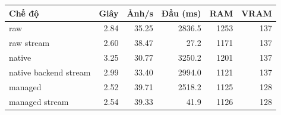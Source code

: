 \begin{tabular}{lrrrrr}
\toprule
Chế độ & Giây & Ảnh/s & Đầu (ms) & RAM & VRAM \\
\midrule
raw & 2.84 & 35.25 & 2836.5 & 1253 & 137 \\
raw stream & 2.60 & 38.47 & 27.2 & 1171 & 137 \\
native & 3.25 & 30.77 & 3250.2 & 1201 & 137 \\
native backend stream & 2.99 & 33.40 & 2994.0 & 1121 & 137 \\
managed & 2.52 & 39.71 & 2518.2 & 1125 & 128 \\
managed stream & 2.54 & 39.33 & 41.9 & 1126 & 128 \\
\bottomrule
\end{tabular}
